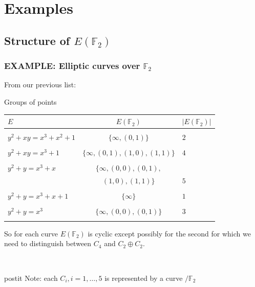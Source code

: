 \documentclass[10pt,final]{beamer} %
\newcommand{\F}{\mathbb F}
\theoremstyle{definition}
\begin{document}
\section{Examples}
\subsection{Structure of \texorpdfstring{$E(\F_2)$}{E(F2)}}
\begin{frame}
\frametitle{EXAMPLE: Elliptic curves over $\F_2$}

From our previous list:
\begin{block}{Groups of points}
\begin{tabular}{|l|c|l|}
\hline
 $E$ & $E(\F_2)$ & $|E(\F_2)|$\\
\hline
&&\\
 $y^2+xy=x^3+x^2+1$ & $\{\infty,(0,1)\}$& $2$\\
&&\\
$y^2+xy=x^3+1$ & $\{\infty,(0,1),(1,0),(1,1)\}$ & $4$\\
&&\\
$y^2+y=x^3+x$&$\{\infty,(0,0),(0,1),$ &\\ &$(1,0),(1,1)\}$&$5$\\
&&\\
 $y^2+y=x^3+x+1$ &$\{\infty\}$&$1$\\
&&\\
$y^2+y=x^3$ & $\{\infty,(0,0), (0,1)\}$ & $3$ \\
&&\\\hline
\end{tabular}
\end{block}
\pause
So for each curve $E(\F_2)$ is cyclic except possibly for the second for which we need to distinguish between
$C_4$ and $C_2\oplus C_2$.\pause

\ \hfill \begin{beamercolorbox}[center,wd=9cm]{postit}
Note: each $C_i, i=1,\ldots,5$ is represented by a curve $/\F_2$
            \end{beamercolorbox}
\end{frame}
\end{document}
